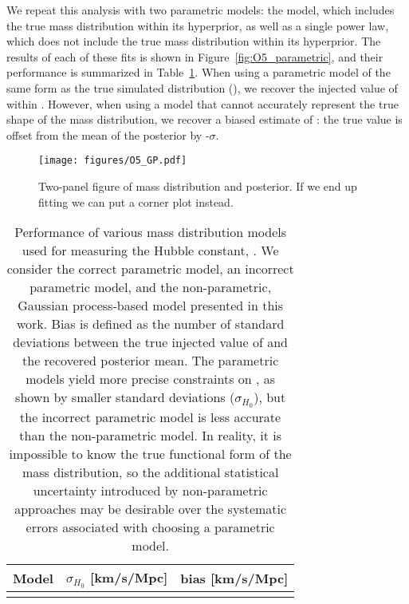 \documentclass[]{aastex631}
\begin{document}
We repeat this analysis with two parametric models: the \plp{} model, which includes the true mass distribution within its hyperprior, as well as a single power law, which does not include the true mass distribution within its hyperprior.
The results of each of these fits is shown in Figure~\ref{fig:O5_parametric}, and their performance is summarized in Table~\ref{tab:bias}.
When using a parametric model of the same form as the true simulated distribution (\plp), we recover the injected value of \Ho{} within .
However, when using a model that cannot accurately represent the true shape of the mass distribution, we recover a biased estimate of \Ho: the true value is offset from the mean of the posterior by -$\sigma$.

\begin{figure}
    \centering
    \texttt{[image: figures/O5\_GP.pdf]}
    \caption{Two-panel figure of mass distribution and \Ho{} posterior. If we end up fitting \Omm{} we can put a corner plot instead.}
    \label{fig:O5_GP}
\end{figure}


\begin{table}[]
    \centering
    \begin{tabular}{c|c c}
         Model & $\sigma_{H_0}$ [km/s/Mpc] & bias [km/s/Mpc]\\
         \hline
         & 
    \end{tabular}
    \caption{Performance of various mass distribution models used for measuring the Hubble constant, \Ho.
    We consider the correct parametric model, an incorrect parametric model, and the non-parametric, Gaussian process-based model presented in this work.
    Bias is defined as the number of standard deviations between the true injected value of \Ho and the recovered posterior mean. 
    The parametric models yield more precise constraints on \Ho{}, as shown by smaller standard deviations ($\sigma_{H_0}$), but the incorrect parametric model is less accurate than the non-parametric model.
    In reality, it is impossible to know the true functional form of the mass distribution, so the additional statistical uncertainty introduced by non-parametric approaches may be desirable over the systematic errors associated with choosing a parametric model.
    }
    \label{tab:bias}
\end{table}
\end{document}
